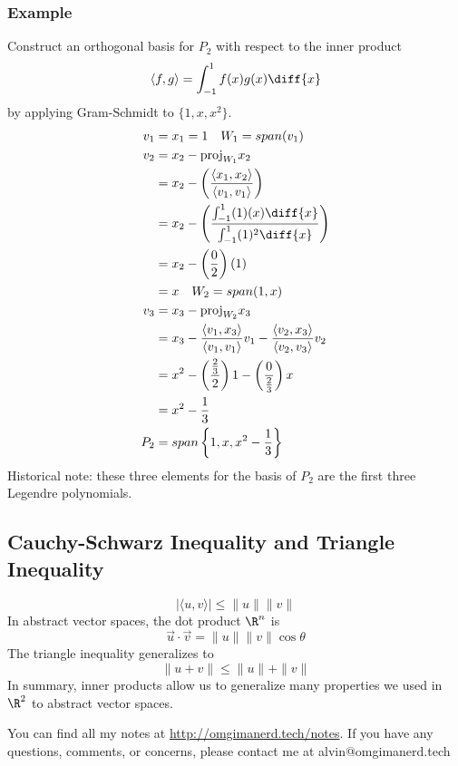 \documentclass{math}
\begin{document}
\subsubsection*{Example}
Construct an orthogonal basis for \( P_2 \) with respect to the inner product
\[ \langle f,g\rangle = \int_{-1}^{1}f(x)g(x)\diff{x} \]
by applying Gram-Schmidt to \( \{1,x,x^2\} \).
\begin{align*}
  v_1 &= x_1 = 1 \quad W_1 = span(v_1) \\
  v_2 &= x_2-\text{proj}_{W_1}x_2 \\
  &= x_2-\left(\frac{\langle x_1,x_2\rangle}{\langle v_1,v_1\rangle}\right) \\
  &= x_2-\left(
    \frac{\int_{-1}^{1}(1)(x)\diff{x}}{\int_{-1}^{1}(1)^2\diff{x}}\right) \\
  &= x_2-\left(\frac{0}{2}\right)(1) \\
  &= x \quad W_2 = span(1,x) \\
  v_3 &= x_3-\text{proj}_{W_2}x_3 \\
  &= x_3-\frac{\langle v_1,x_3\rangle}{\langle v_1,v_1\rangle} v_1-
    \frac{\langle v_2,x_3\rangle}{\langle v_2,v_3\rangle}v_2 \\
  &= x^2-\left(\frac{\frac{2}{3}}{2}\right)1-
    \left(\frac{0}{\frac{2}{3}}\right)x \\
  &= x^2-\frac{1}{3} \\
  P_2 &= span\left\{1,x,x^2-\frac{1}{3}\right\}
\end{align*}
Historical note: these three elements for the basis of \( P_2 \) are the first
three Legendre polynomials.

\subsection*{Cauchy-Schwarz Inequality and Triangle Inequality}
\[ |\langle u,v\rangle| \le \|u\|\|v\| \]
In abstract vector spaces, the dot product \( \R^n \) is
\[ \vec{u}\cdot\vec{v} = \|u\|\|v\|\cos\theta \]
The triangle inequality generalizes to
\[ \|u+v\| \le \|u\|+\|v\| \]
In summary, inner products allow us to generalize many properties we used in
\( \R^2 \) to abstract vector spaces.

\begin{center}
  You can find all my notes at \url{http://omgimanerd.tech/notes}. If you have
  any questions, comments, or concerns, please contact me at
  alvin@omgimanerd.tech
\end{center}
\end{document}
